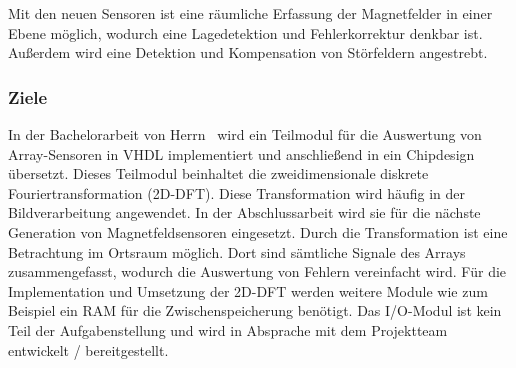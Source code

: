 \smallskip
Mit den neuen Sensoren ist eine räumliche Erfassung der Magnetfelder in einer Ebene möglich, wodurch eine Lagedetektion und Fehlerkorrektur denkbar ist. Außerdem wird eine Detektion und Kompensation von Störfeldern angestrebt.

\subsubsection*{Ziele}
In der Bachelorarbeit von Herrn \theauthor~wird ein Teilmodul für die Auswertung von Array-Sensoren in VHDL implementiert und anschließend in ein Chipdesign übersetzt. Dieses Teilmodul beinhaltet die zweidimensionale diskrete Fouriertransformation (2D-DFT). Diese Transformation wird häufig in der Bildverarbeitung angewendet. In der Abschlussarbeit wird sie für die nächste Generation von Magnetfeldsensoren eingesetzt. Durch die Transformation ist eine Betrachtung im Ortsraum möglich. Dort sind sämtliche Signale des Arrays zusammengefasst, wodurch die Auswertung von Fehlern vereinfacht wird. Für die Implementation und Umsetzung der 2D-DFT werden weitere Module wie zum Beispiel ein RAM für die Zwischenspeicherung benötigt. Das I/O-Modul ist kein Teil der Aufgabenstellung und wird in Absprache mit dem Projektteam entwickelt / bereitgestellt.
